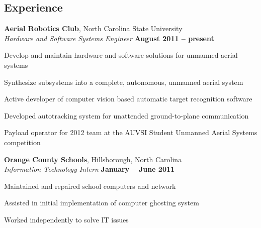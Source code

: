 \documentclass[margin,line,letterpaper]{resume}
\begin{document}
\begin{resume}
    \section{\mysidestyle Experience}

    \textbf{Aerial Robotics Club}, North Carolina State University \vspace{2mm}\\\vspace{1mm}%
    \textsl{Hardware and Software Systems Engineer} \hfill \textbf{August 2011 -- present}\vspace{-3mm}\\\vspace{-1mm}%
    \begin{list2}
    \item Develop and maintain hardware and software solutions for unmanned aerial systems
    \item Synthesize subsystems into a complete, autonomous, unmanned aerial system
    \item Active developer of computer vision based automatic target recognition software
    \item Developed autotracking system for unattended ground-to-plane communication
    \item Payload operator for 2012 team at the AUVSI Student Unmanned Aerial Systems competition
    \end{list2}\vspace{-1.5mm}

    \textbf{Orange County Schools}, Hillsborough, North Carolina \vspace{2mm}\\\vspace{1mm}%
    \textsl{Information Technology Intern} \hfill \textbf{January -- June 2011}\vspace{-3mm}\\\vspace{-1mm}%
    \begin{list2}
    \item Maintained and repaired school computers and network
    \item Assisted in initial implementation of computer ghosting system
    \item Worked independently to solve IT issues
    \end{list2}\vspace{-1.5mm}


\end{resume}
\end{document}
